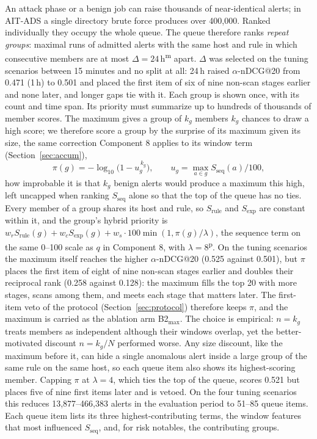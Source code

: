 \documentclass[conference]{IEEEtran}
\newcommand{\prov}{\textsuperscript{\textcolor{orange!80!black}{p}}}   %
\newcommand{\meas}{\textsuperscript{\textcolor{green!45!black}{m}}}    %
\begin{document}
An attack phase or a benign job can raise thousands of near-identical alerts; in AIT-ADS a single directory brute force produces over 400{,}000. Ranked individually they occupy the whole queue. The queue therefore ranks \emph{repeat groups}: maximal runs of admitted alerts with the same host and rule in which consecutive members are at most $\Delta = 24$\,h\meas{} apart. $\Delta$ was selected on the tuning scenarios between 15 minutes and no split at all: 24\,h raised $\alpha$-nDCG@20 from 0.471 (1\,h) to 0.501 and placed the first item of six of nine non-scan stages earlier and none later, and longer gaps tie with it. Each group is shown once, with its count and time span. Its priority must summarize up to hundreds of thousands of member scores. The maximum gives a group of $k_g$ members $k_g$ chances to draw a high score; we therefore score a group by the surprise of its maximum given its size, the same correction Component 8 applies to its window term (Section~\ref{sec:accum}),
\begin{equation}
\pi(g) = -\log_{10}\!\big(1 - u_g^{\,k_g}\big), \qquad u_g = \max_{a \in g} S_\mathrm{seq}(a)/100,
\end{equation}
how improbable it is that $k_g$ benign alerts would produce a maximum this high, left uncapped when ranking $S_\mathrm{seq}$ alone so that the top of the queue has no ties. Every member of a group shares its host and rule, so $S_\mathrm{rule}$ and $S_\mathrm{exp}$ are constant within it, and the group's hybrid priority is $w_r S_\mathrm{rule}(g) + w_c S_\mathrm{exp}(g) + w_s \cdot 100 \min(1, \pi(g)/\lambda)$, the sequence term on the same 0--100 scale as $q$ in Component 8, with $\lambda = 8$\prov{}. On the tuning scenarios the maximum itself reaches the higher $\alpha$-nDCG@20 (0.525 against 0.501), but $\pi$ places the first item of eight of nine non-scan stages earlier and doubles their reciprocal rank (0.258 against 0.128): the maximum fills the top 20 with more stages, scans among them, and meets each stage that matters later. The first-item veto of the protocol (Section~\ref{sec:protocol}) therefore keeps $\pi$, and the maximum is carried as the ablation arm B2$_\mathrm{max}$. The choice is empirical: $n = k_g$ treats members as independent although their windows overlap, yet the better-motivated discount $n = k_g/N$ performed worse. Any size discount, like the maximum before it, can hide a single anomalous alert inside a large group of the same rule on the same host, so each queue item also shows its highest-scoring member. Capping $\pi$ at $\lambda = 4$, which ties the top of the queue, scores 0.521 but places five of nine first items later and is vetoed. On the four tuning scenarios this reduces 13{,}877--466{,}383 alerts in the evaluation period to 51--85 queue items. Each queue item lists its three highest-contributing terms, the window features that most influenced $S_\mathrm{seq}$, and, for risk notables, the contributing groups.
\end{document}
